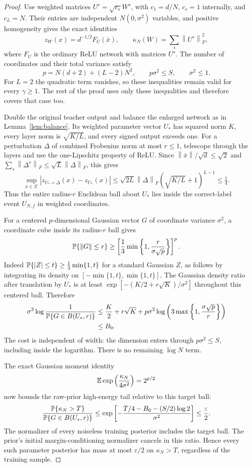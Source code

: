 \documentclass[11pt]{article}
\theoremstyle{remark}\newtheorem{remark}[theorem]{Remark}
\newcommand{\norm}[1]{\left\lVert#1\right\rVert}
\newcommand{\cX}{\mathcal X}\newcommand{\cF}{\mathcal F}\newcommand{\cG}{\mathcal G}
\begin{document}
\begin{proof}
Use weighted matrices $U^s=\sqrt{c_s}W^s$, with $c_1=d/N$, $c_s=1$ internally, and $c_L=N$. Their entries are independent $N(0,\sigma^2)$ variables, and positive homogeneity gives the exact identities
\[
 z_W(x)=d^{-1/2}F_U(\bar x),\qquad
 \kappa_N(W)=\sum_s\norm{U^s}_F^2,
\]
where $F_U$ is the ordinary ReLU network with matrices $U^s$. The number of coordinates and their total variance satisfy
\[
 p=N(d+2)+(L-2)N^2,\qquad p\sigma^2\le S,\qquad \sigma^2\le1.
\]
For $L=2$ the quadratic term vanishes, so these inequalities remain valid for every $\gamma\ge1$. The rest of the proof uses only these inequalities and therefore covers that case too.

Double the original teacher output and balance the enlarged network as in Lemma~\ref{lem:balance}. Its weighted parameter vector $U_*$ has squared norm $K$, every layer norm is $\sqrt{K/L}$, and every signed output exceeds one. For a perturbation $\Delta$ of combined Frobenius norm at most $r\le1$, telescope through the layers and use the one-Lipschitz property of ReLU. Since $\norm{\bar x}/\sqrt d\le\sqrt2$ and $\sum_s\norm{\Delta^s}_F\le\sqrt L\norm\Delta_F$, this gives
\[
 \sup_{x\in\cX}|z_{U_*+\Delta}(x)-z_{U_*}(x)|
 \le\sqrt{2L}\norm\Delta_F
       (\sqrt{K/L}+1)^{L-1}\le\tfrac14.
\]
Thus the entire radius-$r$ Euclidean ball about $U_*$ lies inside the correct-label event $U_{N,f}$ in weighted coordinates.

For a centered $p$-dimensional Gaussian vector $G$ of coordinate variance $\sigma^2$, a coordinate cube inside its radius-$r$ ball gives
\[
 \Prb\{\norm G\le r\}\ge
 \left[\frac13\min\left\{1,\frac r{\sigma\sqrt p}\right\}\right]^p.
\]
Indeed $\mathbb P\{|Z|\le t\}\ge\frac13\min\{1,t\}$ for a standard Gaussian $Z$, as follows by integrating its density on $[-\min\{1,t\},\min\{1,t\}]$.
The Gaussian density ratio after translation by $U_*$ is at least
$\exp[-(K/2+r\sqrt K)/\sigma^2]$ throughout this centered ball. Therefore
\begin{align*}
 \sigma^2\log\frac1{\mathbb P\{G\in B(U_*,r)\}}
 &\le \frac K2+r\sqrt K+
 p\sigma^2\log\left(3\max\left\{1,\frac{\sigma\sqrt p}r\right\}\right)\\
 &\le B_0.
\end{align*}
The cost is independent of width: the dimension enters through $p\sigma^2\le S$, including inside the logarithm. There is no remaining $\log N$ term.

The exact Gaussian moment identity
\[
 \mathbb E\exp\left(\frac{\kappa_N}{4\sigma^2}\right)=2^{p/2}
\]
now bounds the raw-prior high-energy tail relative to this target ball:
\[
 \frac{\mathbb P\{\kappa_N>T\}}{\mathbb P\{G\in B(U_*,r)\}}
 \le\exp\left[-\frac{T/4-B_0-(S/2)\log2}{\sigma^2}\right]
 \le\frac\varepsilon2.
\]
The normalizer of every noiseless training posterior includes the target ball. The prior's initial margin-conditioning normalizer cancels in this ratio. Hence every such parameter posterior has mass at most $\varepsilon/2$ on $\kappa_N>T$, regardless of the training sample.


\end{proof}
\end{document}
